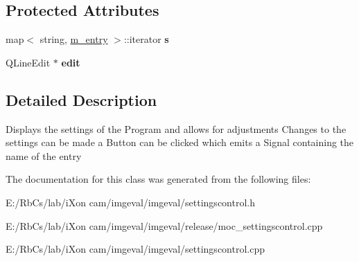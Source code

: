 \subsection*{Protected Attributes}
\begin{CompactItemize}
\item 
\hypertarget{class_settingscontrol_entry_189abbecdce0b5911d13ef103a5afdc4}{
map$<$ string, \hyperlink{classm__entry}{m\_\-entry} $>$::iterator \textbf{s}}
\label{class_settingscontrol_entry_189abbecdce0b5911d13ef103a5afdc4}

\item 
\hypertarget{class_settingscontrol_entry_b04106931e317ed129f14516571ec726}{
QLineEdit $\ast$ \textbf{edit}}
\label{class_settingscontrol_entry_b04106931e317ed129f14516571ec726}

\end{CompactItemize}


\subsection{Detailed Description}
Displays the settings of the Program and allows for adjustments Changes to the settings can be made a Button can be clicked which emits a Signal containing the name of the entry 

The documentation for this class was generated from the following files:\begin{CompactItemize}
\item 
E:/RbCs/lab/iXon cam/imgeval/imgeval/settingscontrol.h\item 
E:/RbCs/lab/iXon cam/imgeval/imgeval/release/moc\_\-settingscontrol.cpp\item 
E:/RbCs/lab/iXon cam/imgeval/imgeval/settingscontrol.cpp\end{CompactItemize}

